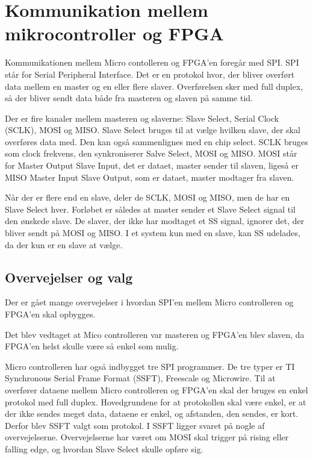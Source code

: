 \section{Kommunikation mellem mikrocontroller og FPGA}


Kommunikationen mellem Micro contolleren og FPGA’en foregår med SPI. SPI står for Serial Peripheral Interface. Det er en protokol hvor, der bliver overført data mellem en master og en eller flere slaver. Overførelsen sker med full duplex, så der bliver sendt data både fra masteren og slaven på samme tid.

Der er fire kanaler mellem masteren og slaverne: Slave Select, Serial Clock (SCLK), MOSI og MISO. Slave Select bruges til at vælge hvilken slave, der skal overføres data med. Den kan også sammenlignes med en chip select. SCLK bruges som clock frekvens, den synkroniserer Salve Select, MOSI og MISO. MOSI står for Master Output Slave Input, det er dataet, master sender til slaven, ligeså er MISO Master Input Slave Output, som er dataet, master modtager fra slaven.

Når der er flere end en slave, deler de SCLK, MOSI og MISO, men de har en Slave Select hver. Forløbet er således at master sender et Slave Select signal til den ønskede slave. De slaver, der ikke har modtaget et SS signal, ignorer det, der bliver sendt på MOSI og MISO. I et system kun med en slave, kan SS udelades, da der kun er en slave at vælge. 
 

\subsection{Overvejelser og valg}
Der er gået mange overvejelser i hvordan SPI'en mellem Micro controlleren og FPGA'en skal  opbygges.

Det blev vedtaget at Mico controlleren var masteren og FPGA'en blev slaven, da FPGA'en helst skulle være så enkel som mulig.

Micro controlleren har også indbygget tre SPI programmer. De tre typer er TI Synchronous Serial Frame Format (SSFT), Freescale og Microwire. Til at overfører dataene mellem Micro controlleren og FPGA’en skal der bruges en enkel protokol med full duplex. Hovedgrundene for at protokollen skal være enkel, er at der ikke sendes meget data, dataene er enkel, og afstanden, den sendes, er kort. Derfor blev SSFT valgt som protokol. I SSFT ligger svaret på nogle af overvejelserne. Overvejelserne har været om MOSI skal trigger på rising eller falling edge, og hvordan Slave Select skulle opføre sig.

